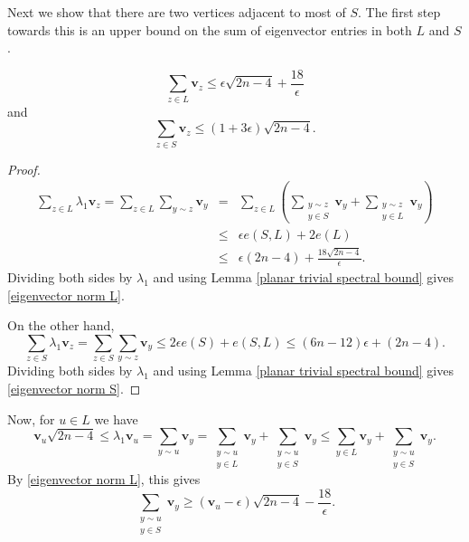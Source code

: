 Next we show that there are two vertices adjacent to most of $S$. The first step towards this is an upper bound on the sum of eigenvector entries in both $L$ and $S$.
\begin{lemma}
\begin{equation}\label{eigenvector norm L}
\sum_{z\in L} \mathbf{v}_z \leq  \epsilon \sqrt{2n-4} + \frac{18}{\epsilon}
\end{equation}
\noindent and
 \begin{equation}\label{eigenvector norm S}
 \sum_{z\in S} \mathbf{v}_z \leq (1+3\epsilon)\sqrt{2n-4}.
 \end{equation}

\end{lemma}
\begin{proof}
\begin{eqnarray*}
  \sum_{z\in L} \lambda_1 \mathbf{v}_z = \sum_{z\in L} \sum_{y\sim z} \mathbf{v}_y &=& \sum_{z\in L}\left( \sum_{\substack{y\sim z \\ y\in S}} \mathbf{v}_y + \sum_{\substack{y\sim z\\ y\in L}} \mathbf{v}_y \right) \\
  & \leq & \epsilon e(S,L) + 2e(L) \\
  & \leq & \epsilon (2n-4) + \frac{18\sqrt{2n-4}}{\epsilon}.
\end{eqnarray*}
Dividing both sides by $\lambda_1$ and using Lemma \ref{planar trivial spectral bound} gives \eqref{eigenvector norm L}.

 On the other hand,
 \[
 \sum_{z\in S} \lambda_1 \mathbf{v}_z = \sum_{z\in S}\sum_{y\sim z} \mathbf{v}_y \leq 2\epsilon e(S) + e(S,L) \leq (6n-12)\epsilon  + (2n-4).
 \]
 Dividing both sides by $\lambda_1$ and using Lemma \ref{planar trivial spectral bound} gives \eqref{eigenvector norm S}.
 \end{proof}

 Now, for $u\in L$ we have
\[
\mathbf{v}_u\sqrt{2n-4} \leq \lambda_1 \mathbf{v}_u=\sum_{y\sim u} \mathbf{v}_y = \sum_{\substack{y\sim u \\ y\in L}} \mathbf{v}_y + \sum_{\substack{y\sim u\\ y\in S}} \mathbf{v}_y \leq \sum_{y\in L} \mathbf{v}_y + \sum_{\substack{y\sim u \\y\in S}} \mathbf{v}_y.
\]
By \eqref{eigenvector norm L}, this gives
\begin{equation}\label{eigenvector norm neighbors of w}
\sum_{\substack{y\sim u \\ y\in S}} \mathbf{v}_y \geq (\mathbf{v}_u-\epsilon)\sqrt{2n-4} - \frac{18}{\epsilon}.
\end{equation}

